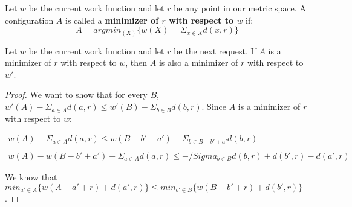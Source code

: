 \begin{definition}
    Let $w$ be the current work function and let $r$ be any point in our metric space. A configuration $A$ is called a \textbf{minimizer of $r$ with respect to $w$} if:
    \begin{equation*}
        A = argmin_{(X)} \{ w(X) = \Sigma_{x \in X} d(x,r)\}
    \end{equation*}
\end{definition}

\begin{lemma}
    Let $w$ be the current work function and let $r$ be the next request. If $A$ is a minimizer of $r$ with respect to $w$, then $A$ is also a minimizer of $r$ with respect to $w'$.
\end{lemma}

\begin{proof}
    We want to show that for every $B$, $w'(A) - \Sigma_{a \in A} d(a,r) \leq w'(B) - \Sigma_{b \in B} d(b,r)$. Since $A$ is a minimizer of $r$ with respect to $w$:

    \begin{equation*}
        \begin{gathered}
            w(A) - \Sigma_{a \in A} d(a,r) \leq w(B-b' + a') - \Sigma_{b \in B - b' + a'} d(b, r) \\ \\
            w(A) - w(B-b' + a') - \Sigma_{a \in A} d(a,r) \leq -/Sigma_{b \in B} d(b, r) + d(b', r) - d(a', r)
        \end{gathered}
    \end{equation*}
    
    
    We know that $min_{a' \in A} \{ w(A - a' + r) + d(a', r)\} \leq min_{b' \in B} \{ w(B - b' + r) + d(b', r)\}$.
\end{proof}



